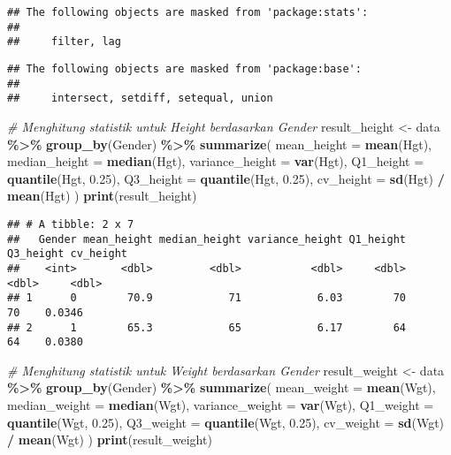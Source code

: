 \documentclass[
]{article}
\newenvironment{Shaded}{\begin{snugshade}}{\end{snugshade}}
\newcommand{\AttributeTok}[1]{\textcolor[rgb]{0.13,0.29,0.53}{#1}}
\newcommand{\CommentTok}[1]{\textcolor[rgb]{0.56,0.35,0.01}{\textit{#1}}}
\newcommand{\FloatTok}[1]{\textcolor[rgb]{0.00,0.00,0.81}{#1}}
\newcommand{\FunctionTok}[1]{\textcolor[rgb]{0.13,0.29,0.53}{\textbf{#1}}}
\newcommand{\NormalTok}[1]{#1}
\newcommand{\OtherTok}[1]{\textcolor[rgb]{0.56,0.35,0.01}{#1}}
\newcommand{\SpecialCharTok}[1]{\textcolor[rgb]{0.81,0.36,0.00}{\textbf{#1}}}
\begin{document}
\begin{verbatim}
## The following objects are masked from 'package:stats':
## 
##     filter, lag
\end{verbatim}

\begin{verbatim}
## The following objects are masked from 'package:base':
## 
##     intersect, setdiff, setequal, union
\end{verbatim}

\begin{Shaded}
\begin{Highlighting}[]
\CommentTok{\# Menghitung statistik untuk Height berdasarkan Gender}
\NormalTok{result\_height }\OtherTok{\textless{}{-}}\NormalTok{ data }\SpecialCharTok{\%\textgreater{}\%}
  \FunctionTok{group\_by}\NormalTok{(Gender) }\SpecialCharTok{\%\textgreater{}\%}
  \FunctionTok{summarize}\NormalTok{(}
    \AttributeTok{mean\_height =} \FunctionTok{mean}\NormalTok{(Hgt),}
    \AttributeTok{median\_height =} \FunctionTok{median}\NormalTok{(Hgt),}
    \AttributeTok{variance\_height =} \FunctionTok{var}\NormalTok{(Hgt),}
    \AttributeTok{Q1\_height =} \FunctionTok{quantile}\NormalTok{(Hgt, }\FloatTok{0.25}\NormalTok{),}
    \AttributeTok{Q3\_height =} \FunctionTok{quantile}\NormalTok{(Hgt, }\FloatTok{0.25}\NormalTok{),}
    \AttributeTok{cv\_height =} \FunctionTok{sd}\NormalTok{(Hgt) }\SpecialCharTok{/} \FunctionTok{mean}\NormalTok{(Hgt)}
\NormalTok{  )}
\FunctionTok{print}\NormalTok{(result\_height)}
\end{Highlighting}
\end{Shaded}

\begin{verbatim}
## # A tibble: 2 x 7
##   Gender mean_height median_height variance_height Q1_height Q3_height cv_height
##    <int>       <dbl>         <dbl>           <dbl>     <dbl>     <dbl>     <dbl>
## 1      0        70.9            71            6.03        70        70    0.0346
## 2      1        65.3            65            6.17        64        64    0.0380
\end{verbatim}

\begin{Shaded}
\begin{Highlighting}[]
\CommentTok{\# Menghitung statistik untuk Weight berdasarkan Gender}
\NormalTok{result\_weight }\OtherTok{\textless{}{-}}\NormalTok{ data }\SpecialCharTok{\%\textgreater{}\%}
  \FunctionTok{group\_by}\NormalTok{(Gender) }\SpecialCharTok{\%\textgreater{}\%}
  \FunctionTok{summarize}\NormalTok{(}
    \AttributeTok{mean\_weight =} \FunctionTok{mean}\NormalTok{(Wgt),}
    \AttributeTok{median\_weight =} \FunctionTok{median}\NormalTok{(Wgt),}
    \AttributeTok{variance\_weight =} \FunctionTok{var}\NormalTok{(Wgt),}
    \AttributeTok{Q1\_weight =} \FunctionTok{quantile}\NormalTok{(Wgt, }\FloatTok{0.25}\NormalTok{),}
    \AttributeTok{Q3\_weight =} \FunctionTok{quantile}\NormalTok{(Wgt, }\FloatTok{0.25}\NormalTok{),}
    \AttributeTok{cv\_weight =} \FunctionTok{sd}\NormalTok{(Wgt) }\SpecialCharTok{/} \FunctionTok{mean}\NormalTok{(Wgt)}
\NormalTok{  )}
\FunctionTok{print}\NormalTok{(result\_weight)}
\end{Highlighting}
\end{Shaded}
\end{document}
